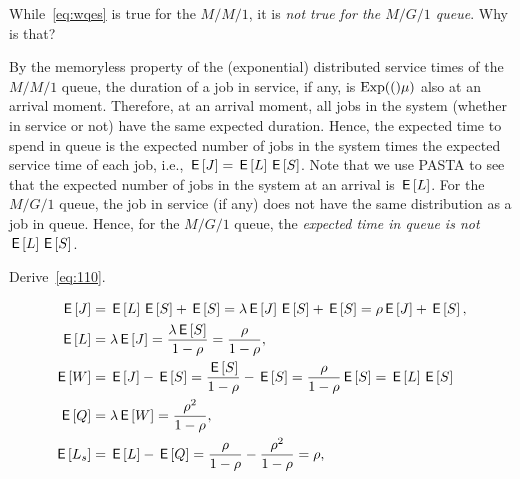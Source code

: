 \begin{exercise}\label{ex:l-216}
While~\cref{eq:wqes} is true for the $M/M/1$, it is \emph{not true for the $M/G/1$ queue}. Why is that?
\begin{solution}
 By the memoryless property of the (exponential) distributed service times of the $M/M/1$ queue, the duration of a job in service, if any, is $\mathrm{Exp}(()\mu)$ also at an arrival moment.
 Therefore, at an arrival moment, all jobs in the system (whether in service or not) have the same expected duration.
 Hence, the expected time to spend in queue is the expected number of jobs in the system times the expected service time of each job, i.e., $\,\mathsf{E}\left[J\right] = \,\mathsf{E}\left[L\right] \,\mathsf{E}\left[S\right]$.
 Note that we use PASTA to see that the expected number of jobs in the system at an arrival is $\,\mathsf{E}\left[L\right]$.
 For the $M/G/1$ queue, the job in service (if any) does not have the same distribution as a job in queue.
 Hence, for the $M/G/1$ queue, the \emph{expected time in queue is not} $\,\mathsf{E}\left[L\right] \,\mathsf{E}\left[S\right]$.
\end{solution}
\end{exercise}

\begin{exercise}\label{ex:l-215}
Derive~\cref{eq:110}.
\begin{solution}
\begin{align*}
 \,\mathsf{E}\left[J\right] &= \,\mathsf{E}\left[L\right] \,\mathsf{E}\left[S\right] + \,\mathsf{E}\left[S\right] = \lambda \,\mathsf{E}\left[J\right] \,\mathsf{E}\left[S\right] + \,\mathsf{E}\left[S\right]= \rho \,\mathsf{E}\left[J\right] + \,\mathsf{E}\left[S\right], \\
 \,\mathsf{E}\left[L\right] &= \lambda \,\mathsf{E}\left[J\right] = \frac{\lambda \,\mathsf{E}\left[S\right]}{1-\rho} = \frac\rho{1-\rho}, \\
 \,\mathsf{E}\left[W\right] &= \,\mathsf{E}\left[J\right] - \,\mathsf{E}\left[S\right] = \frac{\,\mathsf{E}\left[S\right]}{1-\rho} - \,\mathsf{E}\left[S\right] = \frac{\rho}{1-\rho} \,\mathsf{E}\left[S\right] = \,\mathsf{E}\left[L\right] \,\mathsf{E}\left[S\right]\\\
 \,\mathsf{E}\left[Q\right] &= \lambda \,\mathsf{E}\left[W\right] = \frac{\rho^2}{1-\rho}, \\
 \,\mathsf{E}\left[L_s\right] &= \,\mathsf{E}\left[L\right] - \,\mathsf{E}\left[Q\right] = \frac{\rho}{1-\rho} - \frac{\rho^2}{1-\rho} = \rho,
\end{align*}
\end{solution}
\end{exercise}



